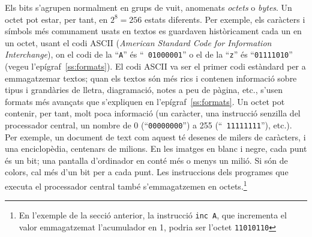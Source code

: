 Els bits s'agrupen normalment en grups de vuit, anomenats {\em octets}
o \emph{bytes}. Un octet pot estar, per tant, en $2^8=256$ estats
diferents. Per exemple, els caràcters i símbols més comunament usats
en textos es guardaven històricament cada un en un octet, usant el
codi ASCII\label{pg:ASCII} (\emph{American Standard Code for
  Information Interchange}), on el codi de la ``{\tt A}'' és ``{\tt
  01000001}'' o el de la ``{\tt z}'' és ``{\tt 01111010}'' (vegeu
l'epígraf~\ref{ss:formats}).  El codi ASCII va ser el primer codi
estàndard per a emmagatzemar textos; quan els textos són més rics i
contenen informació sobre tipus i grandàries de lletra, diagramació,
notes a peu de pàgina, etc., s'usen formats més avançats que
s'expliquen en l'epígraf~\ref{ss:formats}.  Un octet pot contenir, per
tant, molt poca informació (un caràcter, una instrucció senzilla del
processador central, un nombre de 0 (``{\tt 00000000}'') a 255 (``{\tt
  11111111}''), etc.).  Per exemple, un document de text com aquest té
desenes de milers de caràcters, i una enciclopèdia, centenars de
milions. En les imatges en blanc i negre, cada punt és un bit; una
pantalla d'ordinador en conté més o menys un milió. Si són de colors,
cal més d'un bit per a cada punt. Les instruccions dels programes que
executa el processador central també s'emmagatzemen en
octets.\footnote{En l'exemple de la secció anterior, la instrucció
  {\tt inc A}, que incrementa el valor emmagatzemat l'acumulador en 1,
  podria ser l'octet {\tt 11010110}}

